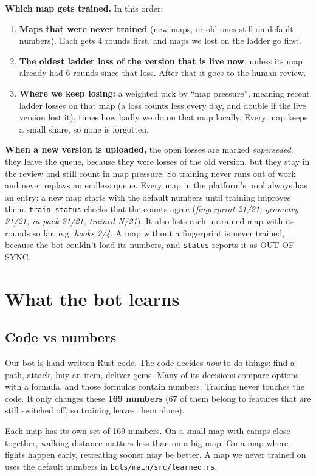 \documentclass[11pt,a4paper]{article}
\newcommand{\f}[1]{\texttt{#1}}
\begin{document}
\textbf{Which map gets trained.} In this order:
\begin{enumerate}
\item \textbf{Maps that were never trained} (new maps, or old ones still on default numbers). Each gets 4 rounds
  first, and maps we lost on the ladder go first.
\item \textbf{The oldest ladder loss of the version that is live now}, unless its map already had 6 rounds
  since that loss. After that it goes to the human review.
\item \textbf{Where we keep losing:} a weighted pick by ``map pressure'', meaning recent ladder losses on
  that map (a loss counts less every day, and double if the live version lost it), times how badly we
  do on that map locally. Every map keeps a small share, so none is forgotten.
\end{enumerate}
\textbf{When a new version is uploaded,} the open losses are marked \emph{superseded}: they leave the
queue, because they were losses of the old version, but they stay in the review and still count in map
pressure. So training never runs out of work and never replays an endless queue.
Every map in the platform's pool always has an entry: a new map starts with the default numbers
until training improves them. \f{train status} checks that the counts agree
(\emph{fingerprint 21/21, geometry 21/21, in pack 21/21, trained N/21}). It also lists each untrained
map with its rounds so far, e.g. \emph{hooks 2/4}. A map without a fingerprint is never trained,
because the bot couldn't load its numbers, and \f{status} reports it as OUT OF SYNC.

\section{What the bot learns}\label{sec:learn}
\subsection*{Code vs numbers}
Our bot is hand-written Rust code. The code decides \emph{how} to do things: find a path, attack,
buy an item, deliver gems. Many of its decisions compare options with a formula, and those formulas
contain numbers. Training never touches the code. It only changes these \textbf{169 numbers}
(67 of them belong to features that are still switched off, so training leaves them alone).

Each map has its own set of 169 numbers. On a small map with camps close together, walking distance
matters less than on a big map. On a map where fights happen early, retreating sooner may be better.
A map we never trained on uses the default numbers in \f{bots/main/src/learned.rs}.
\end{document}
